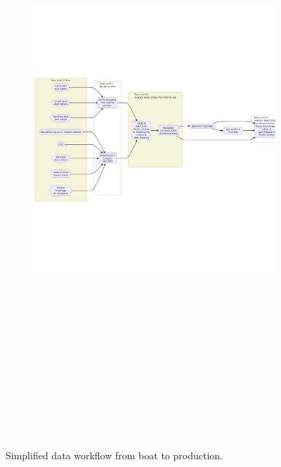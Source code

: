 \documentclass[
  letterpaper,
  oneside,
  open=any]{scrbook}
\begin{document}
\begin{figure}

{\centering 

\begin{figure}[H]

{\centering \includegraphics[width=17.47in,height=8.76in]{content/intro-workflow_files/figure-latex/mermaid-figure-3.png}

}

\end{figure}

}

\caption{\label{fig-workflow}Simplified data workflow from boat to
production.}

\end{figure}
\end{document}
